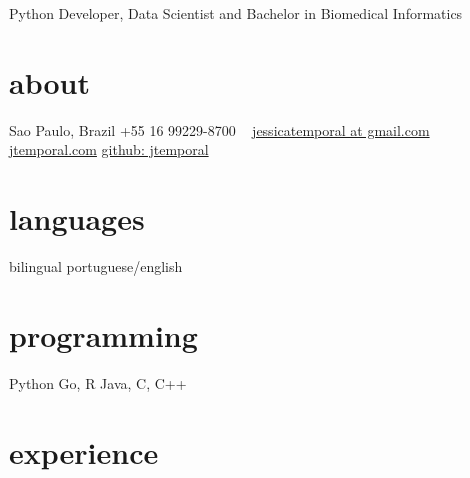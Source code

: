 \documentclass[]{friggeri-cv}
\begin{document}
       {Python Developer, Data Scientist and Bachelor in Biomedical Informatics}


\begin{aside}
  \section{about}
    Sao Paulo, Brazil
    +55 16 99229-8700
    ~
    \href{mailto:jessicatemporal@gmail.com}{jessicatemporal at gmail.com}
    \href{https://jtemporal.com}{jtemporal.com}
    \href{https://github.com/jtemporal/}{github: jtemporal}
  \section{languages}
    bilingual portuguese/english
  \section{programming}
    Python
    Go, R
    Java, C, C++
\end{aside}

\section{experience}
\end{document}
